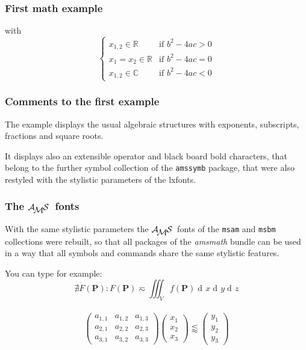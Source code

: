 \documentclass{beamer}\errorcontextlines=9
\newcommand\AMS{\ensuremath{\mathcal{A\!_{\textstyle M}\mkern-2mu S}}}
\DeclareMathOperator{\diff}{\mathrm{d}\!}
\def\TRON{\tracingcommands=2\tracingmacros=2\relax}
\def\TROF{\tracingcommands=0\tracingmacros=0\relax}
\begin{document}
\begin{frame}\frametitle{First math example}
\noindent with
\begin{equation}
\begin{cases}
x_{1,2} \in \mathbb{R} &\text{if } b^2-4ac>0\\
x_1=x_2 \in \mathbb{R} &\text{if } b^2-4ac=0\\
x_{1,2} \in \mathbb{C} &\text{if } b^2-4ac<0
\end{cases}
\end{equation}
\end{frame}

\begin{frame}\frametitle{Comments to the first example}
The example displays the usual algebraic structures with exponents, subscripts, fractions and square roots.

It displays also an extensible operator and \alert{black board bold} characters, that belong to the further symbol collection of the \texttt{amssymb} package, that were also restyled with the stylistic parameters of the lxfonts.

\end{frame}

\begin{frame}\frametitle{The \AMS\ fonts}
With the same stylistic parameters the \AMS\ fonts of the \texttt{msam} and \texttt{msbm} collections were rebuilt, so that all packages of the \textsl{amsmath} bundle can be used in a way that all symbols and commands share the same stylistic features. 

You can type for example:
\TRON\begin{equation}
\nexists F(\boldsymbol{P}) : F(\boldsymbol{P}) \eqsim \iiint_V f(\boldsymbol{P}) \diff x \diff y \diff z
\end{equation}\TROF
~
\begin{equation}
\begin{pmatrix}
a_{1,1} & a_{1,2} & a_{1,3}\\
a_{2,1} & a_{2,2} & a_{2,3}\\
a_{3,1} & a_{3,2} & a_{3,3}
\end{pmatrix}
\begin{pmatrix}
x_1 \\ x_2 \\ x_3
\end{pmatrix}
\lessapprox
\begin{pmatrix}
y_1 \\ y_2 \\ y_3
\end{pmatrix}
\end{equation}
\end{frame}
\end{document}

